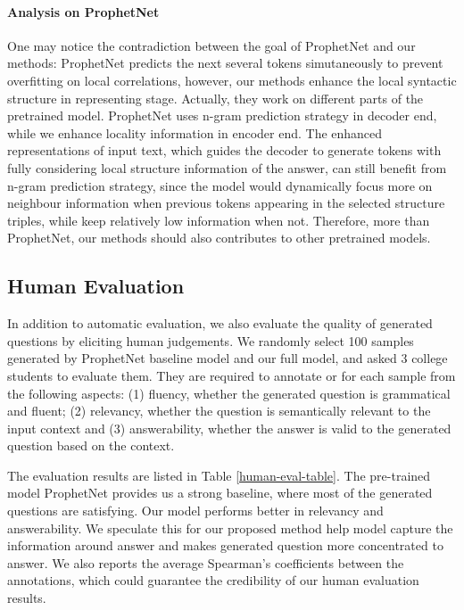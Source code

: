 \documentclass[11pt]{article}
\begin{document}
\paragraph{Analysis on ProphetNet} One may notice the contradiction between the goal of ProphetNet and our methods: ProphetNet predicts the next several tokens simutaneously to prevent overfitting on local correlations, however, our methods enhance the local syntactic structure in representing stage. Actually, they work on different parts of the pretrained model. ProphetNet uses n-gram prediction strategy in decoder end, while we enhance locality information in encoder end. The enhanced representations of input text, which guides the decoder to generate tokens with fully considering local structure information of the answer, can still benefit from n-gram prediction strategy, since the model would dynamically focus more on neighbour information when previous tokens appearing in the selected structure triples, while keep relatively low information when not. Therefore, more than ProphetNet, our methods should also contributes to other pretrained models.
\subsection{Human Evaluation}
In addition to automatic evaluation, we also evaluate the quality of generated questions by eliciting human judgements. We randomly select 100  samples generated by ProphetNet baseline model and our full model, and asked 3 college students to evaluate them. They are required to annotate  or  for each sample from the following aspects: (1) fluency, whether the generated question is grammatical and fluent; (2) relevancy, whether the question is semantically relevant to the input context and (3) answerability, whether the answer is valid to the generated question based on the context. 


The evaluation results are listed in Table \ref{human-eval-table}. The pre-trained model ProphetNet provides us a strong baseline, where most of the generated questions are satisfying. Our model performs better in relevancy and answerability. We speculate this for our proposed method help model capture the information around answer and makes generated question more concentrated to answer. We also reports the average Spearman's coefficients between the annotations, which could guarantee the credibility of our human evaluation results.
\end{document}
